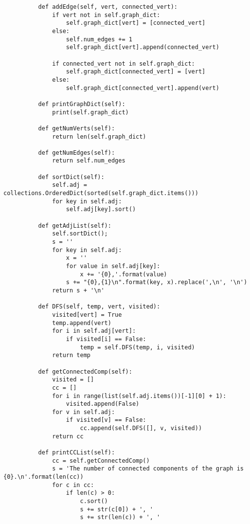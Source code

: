 \documentclass{article}
\begin{document}
\begin{enumerate}
\begin{lstlisting}
          def addEdge(self, vert, connected_vert):  
              if vert not in self.graph_dict:
                  self.graph_dict[vert] = [connected_vert]
              else:
                  self.num_edges += 1
                  self.graph_dict[vert].append(connected_vert)
                  
              if connected_vert not in self.graph_dict:
                  self.graph_dict[connected_vert] = [vert]
              else:
                  self.graph_dict[connected_vert].append(vert)            
      
          def printGraphDict(self):
              print(self.graph_dict)
      
          def getNumVerts(self):
              return len(self.graph_dict)
          
          def getNumEdges(self):
              return self.num_edges
          
          def sortDict(self):
              self.adj = collections.OrderedDict(sorted(self.graph_dict.items()))
              for key in self.adj:
                  self.adj[key].sort()
          
          def getAdjList(self):
              self.sortDict();
              s = ''
              for key in self.adj:
                  x = ''
                  for value in self.adj[key]:
                      x += '{0},'.format(value)
                  s += "{0},{1}\n".format(key, x).replace(',\n', '\n')
              return s + '\n'        
          
          def DFS(self, temp, vert, visited): 
              visited[vert] = True
              temp.append(vert) 
              for i in self.adj[vert]: 
                  if visited[i] == False:                   
                      temp = self.DFS(temp, i, visited) 
              return temp 
                      
          def getConnectedComp(self):
              visited = [] 
              cc = [] 
              for i in range(list(self.adj.items())[-1][0] + 1):
                  visited.append(False) 
              for v in self.adj: 
                  if visited[v] == False: 
                      cc.append(self.DFS([], v, visited)) 
              return cc
          
          def printCCList(self):        
              cc = self.getConnectedComp()        
              s = 'The number of connected components of the graph is {0}.\n'.format(len(cc))
              for c in cc:
                  if len(c) > 0:
                      c.sort()
                      s += str(c[0]) + ', '
                      s += str(len(c)) + ', '
                      

\end{lstlisting}
\end{enumerate}
\end{document}
